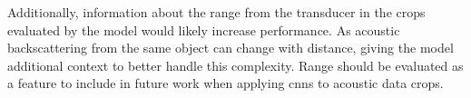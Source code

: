     

    
    Additionally, information about the range from the transducer in the crops evaluated by the model would likely increase performance. As acoustic backscattering from the same object can change with distance, giving the model additional context to better handle this complexity. Range should be evaluated as a feature to include in future work when applying \gls{cnn}s to acoustic data crops. 

    
%    
%    
%    
%    
%
%     
%
